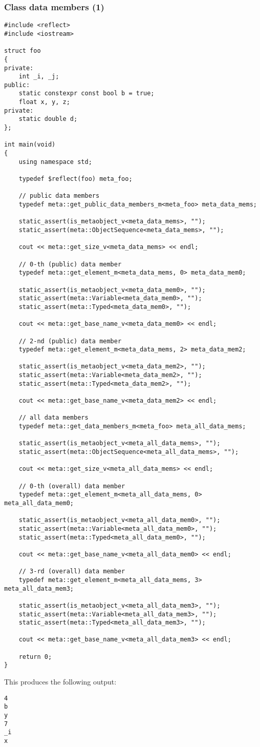\subsubsection{Class data members (1)}

\begin{verbatim}
#include <reflect>
#include <iostream>

struct foo
{
private:
	int _i, _j;
public:
	static constexpr const bool b = true;
	float x, y, z;
private:
	static double d;
};

int main(void)
{
	using namespace std;

	typedef $reflect(foo) meta_foo;

	// public data members
	typedef meta::get_public_data_members_m<meta_foo> meta_data_mems;

	static_assert(is_metaobject_v<meta_data_mems>, "");
	static_assert(meta::ObjectSequence<meta_data_mems>, "");

	cout << meta::get_size_v<meta_data_mems> << endl;

	// 0-th (public) data member
	typedef meta::get_element_m<meta_data_mems, 0> meta_data_mem0;

	static_assert(is_metaobject_v<meta_data_mem0>, "");
	static_assert(meta::Variable<meta_data_mem0>, "");
	static_assert(meta::Typed<meta_data_mem0>, "");

	cout << meta::get_base_name_v<meta_data_mem0> << endl;

	// 2-nd (public) data member
	typedef meta::get_element_m<meta_data_mems, 2> meta_data_mem2;

	static_assert(is_metaobject_v<meta_data_mem2>, "");
	static_assert(meta::Variable<meta_data_mem2>, "");
	static_assert(meta::Typed<meta_data_mem2>, "");

	cout << meta::get_base_name_v<meta_data_mem2> << endl;

	// all data members
	typedef meta::get_data_members_m<meta_foo> meta_all_data_mems;

	static_assert(is_metaobject_v<meta_all_data_mems>, "");
	static_assert(meta::ObjectSequence<meta_all_data_mems>, "");

	cout << meta::get_size_v<meta_all_data_mems> << endl;

	// 0-th (overall) data member
	typedef meta::get_element_m<meta_all_data_mems, 0> meta_all_data_mem0;

	static_assert(is_metaobject_v<meta_all_data_mem0>, "");
	static_assert(meta::Variable<meta_all_data_mem0>, "");
	static_assert(meta::Typed<meta_all_data_mem0>, "");

	cout << meta::get_base_name_v<meta_all_data_mem0> << endl;

	// 3-rd (overall) data member
	typedef meta::get_element_m<meta_all_data_mems, 3> meta_all_data_mem3;

	static_assert(is_metaobject_v<meta_all_data_mem3>, "");
	static_assert(meta::Variable<meta_all_data_mem3>, "");
	static_assert(meta::Typed<meta_all_data_mem3>, "");

	cout << meta::get_base_name_v<meta_all_data_mem3> << endl;

	return 0;
}

\end{verbatim}

This produces the following output:

\begin{verbatim}
4
b
y
7
_i
x
\end{verbatim}
